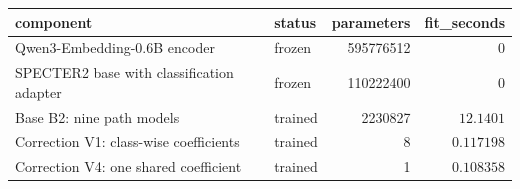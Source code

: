 \begin{tabular}{llrr}
\toprule
component & status & parameters & fit\_seconds \\
\midrule
Qwen3-Embedding-0.6B encoder & frozen & 595776512 & $0$ \\
SPECTER2 base with classification adapter & frozen & 110222400 & $0$ \\
Base B2: nine path models & trained & 2230827 & $12.1401$ \\
Correction V1: class-wise coefficients & trained & 8 & $0.117198$ \\
Correction V4: one shared coefficient & trained & 1 & $0.108358$ \\
\bottomrule
\end{tabular}
